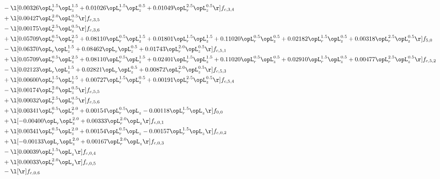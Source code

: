 \begin{alignat}{2}
& - \l[  0.00326 \opL_r^{1.5} \opL_z^{1.5} +  0.01026 \opL_r^{1.5} \opL_z^{0.5} +  0.01049 \opL_r^{2.5} \opL_z^{0.5}  \r] f_{c,3,4} \nonumber \\ 
& + \l[  0.00427 \opL_r^{2.0} \opL_z^{0.5}  \r] f_{c,3,5} \nonumber \\ 
& - \l[  0.00175 \opL_r^{2.5} \opL_z^{0.5}  \r] f_{c,3,6} \nonumber \\ 
& + \l[  0.05709 \opL_r^{0.5} \opL_z^{2.5} +  0.08110 \opL_r^{0.5} \opL_z^{1.5} +  0.01801 \opL_r^{1.5} \opL_z^{1.5} +  0.11020 \opL_r^{0.5} \opL_z^{0.5} +  0.02182 \opL_r^{1.5} \opL_z^{0.5} +  0.00318 \opL_r^{2.5} \opL_z^{0.5}  \r] f_{5,0} \nonumber \\ 
& - \l[  0.06370 \opL_r \opL_z^{1.5} +  0.08462 \opL_r \opL_z^{0.5} +  0.01743 \opL_r^{2.0} \opL_z^{0.5}  \r] f_{c,5,1} \nonumber \\ 
& + \l[  0.05709 \opL_r^{0.5} \opL_z^{2.5} +  0.08110 \opL_r^{0.5} \opL_z^{1.5} +  0.02401 \opL_r^{1.5} \opL_z^{1.5} +  0.11020 \opL_r^{0.5} \opL_z^{0.5} +  0.02910 \opL_r^{1.5} \opL_z^{0.5} +  0.00477 \opL_r^{2.5} \opL_z^{0.5}  \r] f_{c,5,2} \nonumber \\ 
& - \l[  0.02123 \opL_r \opL_z^{1.5} +  0.02821 \opL_r \opL_z^{0.5} +  0.00872 \opL_r^{2.0} \opL_z^{0.5}  \r] f_{c,5,3} \nonumber \\ 
& + \l[  0.00600 \opL_r^{1.5} \opL_z^{1.5} +  0.00727 \opL_r^{1.5} \opL_z^{0.5} +  0.00191 \opL_r^{2.5} \opL_z^{0.5}  \r] f_{c,5,4} \nonumber \\ 
& - \l[  0.00174 \opL_r^{2.0} \opL_z^{0.5}  \r] f_{c,5,5} \nonumber \\ 
& + \l[  0.00032 \opL_r^{2.5} \opL_z^{0.5}  \r] f_{c,5,6} \nonumber \\ 
& + \l[  0.00341 \opL_r^{0.5} \opL_z^{2.0} +  0.00154 \opL_r^{0.5} \opL_z   -0.00118 \opL_r^{1.5} \opL_z  \r] f_{0,0} \nonumber \\ 
& + \l[  -0.00400 \opL_r \opL_z^{2.0} +  0.00333 \opL_r^{2.0} \opL_z  \r] f_{c,0,1} \nonumber \\ 
& + \l[  0.00341 \opL_r^{0.5} \opL_z^{2.0} +  0.00154 \opL_r^{0.5} \opL_z   -0.00157 \opL_r^{1.5} \opL_z  \r] f_{c,0,2} \nonumber \\ 
& + \l[  -0.00133 \opL_r \opL_z^{2.0} +  0.00167 \opL_r^{2.0} \opL_z  \r] f_{c,0,3} \nonumber \\ 
& - \l[  0.00039 \opL_r^{1.5} \opL_z  \r] f_{c,0,4} \nonumber \\ 
& + \l[  0.00033 \opL_r^{2.0} \opL_z  \r] f_{c,0,5} \nonumber \\ 
& - \l[  \r] f_{c,0,6} \nonumber \\ 

\end{alignat}
